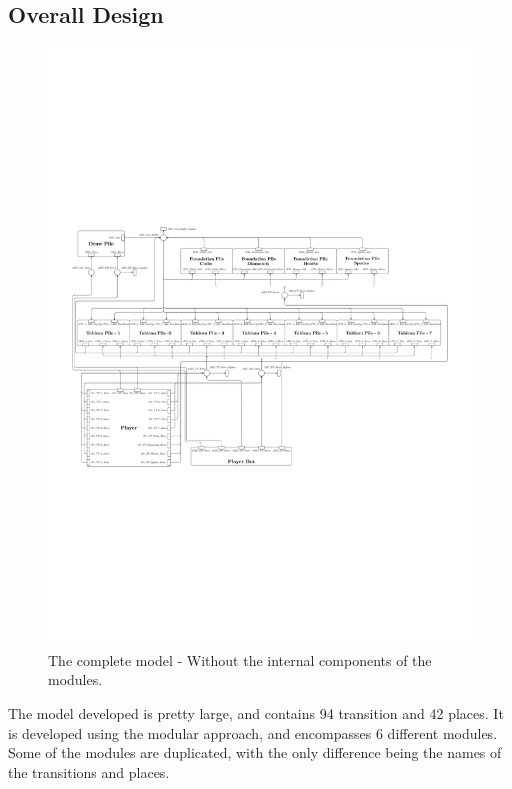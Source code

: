\documentclass[runningheads,a4paper]{llncs}
\begin{document}
\subsection{Overall Design}

\begin{figure}
	\begin{center} %
		\includegraphics[trim=250 260 230 330,scale=1.1]{images/overallViewPdf}
		\caption{The complete model - Without the internal components of the modules.}
		\label{fig:full_horizontal}
	\end{center}
\end{figure}


The model developed is pretty large, and contains 94 transition and 42 places. It is developed using the modular approach, and encompasses 6 different modules. Some of the modules are duplicated, with the only difference being the names of the transitions and places.
\newline
\end{document}
